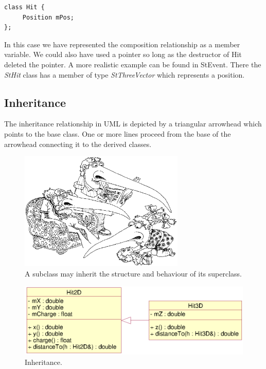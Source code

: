 \documentclass[twoside]{article}
\newcommand{\name}[1]{\textsl{#1}}%
\newcommand{\StEvent}{\textsf{StEvent}}
\begin{document}
{\footnotesize
\begin{verbatim}
class Hit {
     Position mPos;
};
\end{verbatim}
}%

In this case we have represented the composition relationship as a
member variable. We could also have used a pointer so long as the
destructor of Hit deleted the pointer.  A more realistic example can
be found in \StEvent. There the \name{StHit} class has a member of
type \name{StThreeVector} which represents a position.

\subsection{Inheritance}

The inheritance relationship in UML is depicted by a triangular
arrowhead which points to the base class. One or more lines proceed
from the base of the arrowhead connecting it to the derived classes.
\begin{figure}[htb]
    \begin{center}
        \includegraphics[width=0.7\textwidth]{cartoon6.eps}
        \caption{A subclass may inherit the structure and behaviour
            of its superclass.}
    \end{center}
\end{figure}
\begin{figure}[htb]
    \begin{center}
        \includegraphics{umlInheritance.eps}
        \caption{Inheritance.}
        \label{fig:umlInheritance}
    \end{center}
\end{figure}
\end{document}
